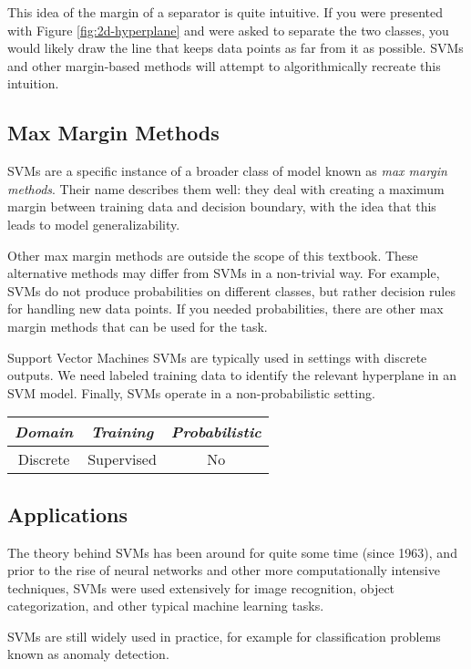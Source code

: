 This idea of the margin of a separator is quite intuitive. If you were presented with Figure \ref{fig:2d-hyperplane} and were asked to separate the two classes, you would likely draw the line that keeps data points as far from it as possible. SVMs and other margin-based methods will attempt to algorithmically recreate this intuition.

\subsection{Max Margin Methods}
SVMs are a specific instance of a broader class of model known as \textit{max margin methods}. Their name describes them well: they deal with creating a maximum margin between training data and decision boundary, with the idea that this leads to model generalizability. 

Other max margin methods are outside the scope of this textbook. These alternative methods may differ from SVMs in a non-trivial way. For example, SVMs do not produce probabilities  on different classes, but rather decision rules for handling new data points. If you needed probabilities, there are other max margin methods that can be used for the task.
%
\begin{mlcube}{Support Vector Machines}
SVMs are typically used in settings with discrete outputs. We need labeled training data to identify the relevant hyperplane in an SVM model. Finally, SVMs operate in a non-probabilistic setting.
\begin{center}
    \begin{tabular}{c|c|c}
    \textit{\textbf{Domain}} & \textit{\textbf{Training}} & \textit{\textbf{Probabilistic}} \\
    \hline
    Discrete & Supervised & No \\
    \end{tabular}
\end{center}
\end{mlcube}

\subsection{Applications}
The theory behind SVMs has been around for quite some time (since 1963), and prior to the rise of neural networks and other more computationally intensive techniques, SVMs were used extensively for image recognition, object categorization, and other typical machine learning tasks.

SVMs are still widely used in practice, for example for  classification problems known as anomaly detection.
%

